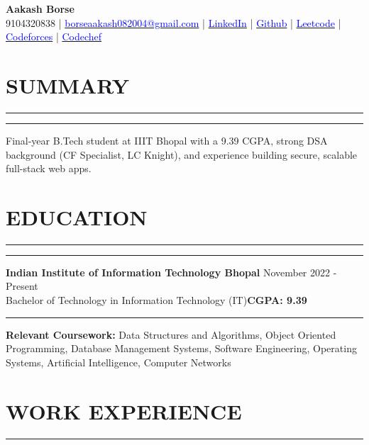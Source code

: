 \documentclass[a4paper]{article}
\newcommand{\sectionline}{
   \vspace{-2em} %
    \noindent\rule{\textwidth}{0.4pt}
    \vspace{0em} %
}
\newcommand{\verticalInd}{
   \vspace{-0.9em} %
    \noindent\rule{\textwidth}{0pt}
    \vspace{0em} %
}
\begin{document}
\begin{center}
    \LARGE \textbf{Aakash Borse} \\
    \vspace{5pt}
    \normalsize
    9104320838 | 
    \href{mailto:borseaakash082004@gmail.com}{\textcolor{blue}{borseaakash082004@gmail.com}} |
    \href{https://www.linkedin.com/in/aakash-borse-977077278/}{\textcolor{blue}{LinkedIn}} |
    \href{https://github.com/aakash811}{\textcolor{blue}{Github}}
    |
    \href{https://leetcode.com/u/aakash_811/}{\textcolor{blue}{Leetcode}}
    |
    \href{https://codeforces.com/profile/Aakash_0880}{\textcolor{blue}{Codeforces}}
    |
    \href{https://www.codechef.com/users/void_dear_68}{\textcolor{blue}{Codechef}}
\end{center}
\vspace{-1.5em}

\section*{SUMMARY}
\sectionline
\verticalInd
Final-year B.Tech student at IIIT Bhopal with a 9.39 CGPA, strong DSA background (CF Specialist, LC Knight), and experience building secure, scalable full-stack web apps.
\vspace{-0.5em}

\section*{EDUCATION}
\sectionline
\verticalInd
\textbf{Indian Institute of Information Technology Bhopal} \hfill November 2022 - Present \\
Bachelor of Technology in Information Technology (IT)\hfill \textbf{CGPA: 9.39}\\
\verticalInd
\textbf{Relevant Coursework:} Data Structures and Algorithms, Object Oriented Programming, Database Management Systems, Software Engineering, Operating Systems, Artificial Intelligence, Computer Networks\\
\vspace{-1.75em}

\section*{WORK EXPERIENCE}
\sectionline
\vspace{-2.25em}
\end{document}
